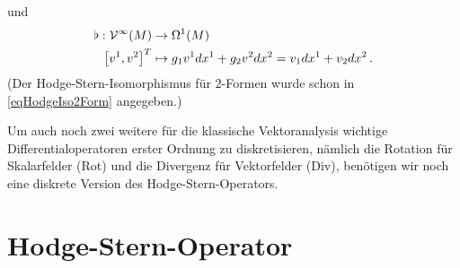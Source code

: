   und
  \begin{align}
    \begin{aligned}
      \flat: \mathcal{V}^{\infty}(M) &\rightarrow \Omega^{1}(M) \\
             \left[ v^{1}, v^{2} \right]^{T} &\mapsto g_{1}v^{1} dx^{1} + g_{2}v^{2} dx^{2} = v_{1} dx^{1} + v_{2} dx^{2} \,\text{.}
    \end{aligned}
  \end{align}
  (Der Hodge-Stern-Isomorphismus für \( 2 \)-Formen wurde schon in \eqref{eqHodgeIso2Form} angegeben.)
  
  Um auch noch zwei weitere für die klassische Vektoranalysis wichtige Differentialoperatoren erster Ordnung zu diskretisieren,
  nämlich die Rotation für Skalarfelder (Rot) und die Divergenz für Vektorfelder (Div), 
  benötigen wir noch eine diskrete Version des Hodge-Stern-Operators.
 

  

  

  

\section{Hodge-Stern-Operator}
\label{secHodgeStar}


